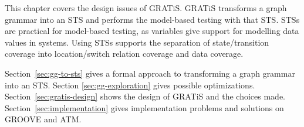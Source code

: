 This chapter covers the design issues of GRATiS. GRATiS transforms a graph grammar into an STS and performs the model-based testing with that STS. STSs are practical for model-based testing, as variables give support for modelling data values in systems. Using STSs supports the separation of state/transition coverage into location/switch relation coverage and data coverage.

Section~\ref{sec:gg-to-sts} gives a formal approach to transforming a graph grammar into an STS. Section \ref{sec:gg-exploration} gives possible optimizations. Section~\ref{sec:gratis-design} shows the design of GRATiS and the choices made. Section~\ref{sec:implementation} gives implementation problems and solutions on GROOVE and ATM.
